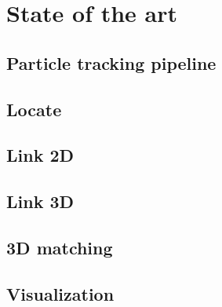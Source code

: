 \chapter{State of the art}
\label{chap:stateart}

\section{Particle tracking pipeline}

\section{Locate}

\section{Link 2D}

\section{Link 3D}

\section{3D matching}

\section{Visualization}
